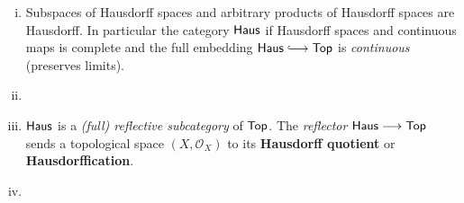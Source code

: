 \begin{lemma}\vspace{-1.5em}
	\begin{enumerate}[(i)]
		\item{
			Subspaces of Hausdorff spaces and arbitrary products of Hausdorff spaces are Hausdorff. In particular the category $\textsf{Haus}$ if Hausdorff spaces and continuous maps is complete and the full embedding $\ncat{Haus} \longrightincl \ncat{Top}$ is \textit{continuous} (preserves limits).
		}
		\item{
		}
		\item{
			$\textsf{Haus}$ is a \textit{(full) reflective subcategory} of $\textsf{Top}$. The \textit{reflector} $\textsf{Haus} --> \textsf{Top}$ sends a topological space $(X,\mathcal{O}_X)$ to its \textbf{Hausdorff quotient} or \textbf{Hausdorffication}.
		}
		\item{
		}
	\end{enumerate}
\end{lemma}
